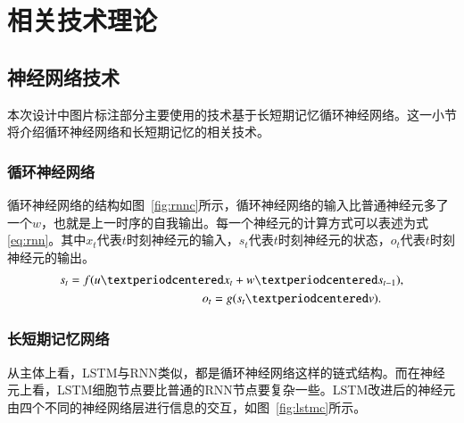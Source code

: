 
\chapter{相关技术理论}

\section{神经网络技术}
本次设计中图片标注部分主要使用的技术基于长短期记忆循环神经网络。这一小节将介绍循环神经网络和长短期记忆的相关技术。

\subsection{循环神经网络}
循环神经网络的结构如图~\ref{fig:rnnc}所示，循环神经网络的输入比普通神经元多了一个$w$，也就是上一时序的自我输出。每一个神经元的计算方式可以表述为式\eqref{eq:rnn}。其中$x_t$代表$t$时刻神经元的输入，$s_t$代表$t$时刻神经元的状态，$o_t$代表$t$时刻神经元的输出。
\begin{equation}
  \begin{split}
    s_t = f(u· x_t + w · s_{t-1}), \\
    o_t = g(s_t·v).\hspace{1.8em}
  \end{split}
  \label{eq:rnn}
\end{equation}

%

\subsection{长短期记忆网络}
从主体上看，LSTM与RNN类似，都是循环神经网络这样的链式结构。而在神经元上看，LSTM细胞节点要比普通的RNN节点要复杂一些。LSTM改进后的神经元由四个不同的神经网络层进行信息的交互，如图~\ref{fig:lstmc}所示。

